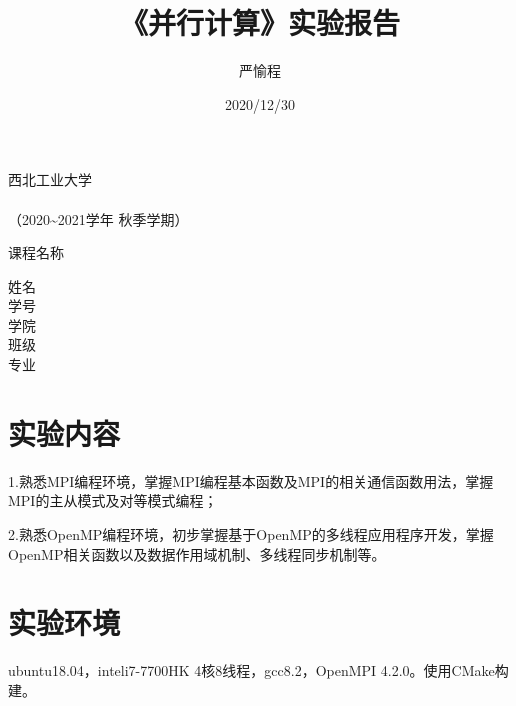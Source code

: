 \documentclass[10pt]{article}
\begin{document}
\begin{titlepage}
    \heiti
    \vspace*{64pt}
    \begin{center}
        \fontsize{56pt}{0} 西北工业大学\\
        \vspace*{36pt}
        \\
        \vspace*{48pt}
        \LARGE（2020\~{}2021学年 秋季学期）\\
        \vspace*{48pt}
    
        \LARGE 课程名称\ \ \ \underline{}\\
        \vspace*{72pt}
    
        \Large 姓名\ \ \underline{}\\
        \Large 学号\ \ \underline{}\\
        \Large 学院\ \ \underline{}\\
        \Large 班级\ \ \underline{}\\
        \Large 专业\ \ \underline{}\\
    \end{center}
\end{titlepage}

\tableofcontents

\title{\bf\Large 《并行计算》实验报告}
\date{2020/12/30}
\author{\small 严愉程}
\maketitle

\thispagestyle{fancy}

\section{实验内容}

1.熟悉MPI编程环境，掌握MPI编程基本函数及MPI的相关通信函数用法，掌握MPI的主从模式及对等模式编程；

2.熟悉OpenMP编程环境，初步掌握基于OpenMP的多线程应用程序开发，掌握OpenMP相关函数以及数据作用域机制、多线程同步机制等。 

\section{实验环境}
ubuntu18.04，inteli7-7700HK 4核8线程，gcc8.2，OpenMPI 4.2.0。使用CMake构建。
\end{document}
